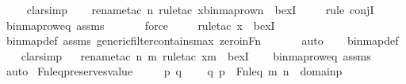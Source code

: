 \begin{isabellebody}
\ \ \ \isamarkupfalse%
\ clarsimp\isanewline
\ \ \ \isamarkupfalse%
{\isacharparenleft}{\kern0pt}rename{\isacharunderscore}{\kern0pt}tac\ n{\isacharcomma}{\kern0pt}\ rule{\isacharunderscore}{\kern0pt}tac\ x{\isacharequal}{\kern0pt}{\isachardoublequoteopen}binmap{\isacharunderscore}{\kern0pt}row{\isacharprime}{\kern0pt}{\isacharparenleft}{\kern0pt}n{\isacharparenright}{\kern0pt}{\isachardoublequoteclose}\ \ bexI{\isacharparenright}{\kern0pt}\isanewline
\ \ \ \ \isamarkupfalse%
{\isacharparenleft}{\kern0pt}rule\ conjI{\isacharparenright}{\kern0pt}\isanewline
\ \ \isamarkupfalse%
\ binmap{\isacharunderscore}{\kern0pt}row{\isacharunderscore}{\kern0pt}eq\ assms\isanewline
\ \ \ \ \ \isamarkupfalse%
\ force\isanewline
\ \ \ \ \isamarkupfalse%
{\isacharparenleft}{\kern0pt}rule{\isacharunderscore}{\kern0pt}tac\ x{\isacharequal}{\kern0pt}{}\ \ bexI{\isacharparenright}{\kern0pt}\isanewline
\ \ \isamarkupfalse%
\ binmap{\isacharprime}{\kern0pt}{\isacharunderscore}{\kern0pt}def\ assms\ generic{\isacharunderscore}{\kern0pt}filter{\isacharunderscore}{\kern0pt}contains{\isacharunderscore}{\kern0pt}max\ zero{\isacharunderscore}{\kern0pt}in{\isacharunderscore}{\kern0pt}Fn\isanewline
\ \ \ \ \ \isamarkupfalse%
\ auto{\isacharbrackleft}{\kern0pt}{}{\isacharbrackright}{\kern0pt}\isanewline
\ \ \isamarkupfalse%
\ binmap{\isacharprime}{\kern0pt}{\isacharunderscore}{\kern0pt}def\isanewline
\ \ \isamarkupfalse%
\ clarsimp\isanewline
\ \ \isamarkupfalse%
{\isacharparenleft}{\kern0pt}rename{\isacharunderscore}{\kern0pt}tac\ n\ m{\isacharcomma}{\kern0pt}\ rule{\isacharunderscore}{\kern0pt}tac\ x{\isacharequal}{\kern0pt}m\ \ bexI{\isacharparenright}{\kern0pt}\isanewline
\ \ \isamarkupfalse%
\ binmap{\isacharunderscore}{\kern0pt}row{\isacharunderscore}{\kern0pt}eq\ assms\isanewline
\ \ \isamarkupfalse%
\ auto%
\endisatagproof
{\isafoldproof}%
%
\isadelimproof
\isanewline
%
\endisadelimproof
\isanewline
{}\isamarkupfalse%
\ Fn{\isacharunderscore}{\kern0pt}leq{\isacharunderscore}{\kern0pt}preserves{\isacharunderscore}{\kern0pt}value\ {\isacharcolon}{\kern0pt}\ \isanewline
\ \ \ p\ q\ \isanewline
\ \ \ {\isachardoublequoteopen}{\isacharless}{\kern0pt}q{\isacharcomma}{\kern0pt}\ p{\isachargreater}{\kern0pt}\ {\isasymin}\ Fn{\isacharunderscore}{\kern0pt}leq{\isachardoublequoteclose}\ {\isachardoublequoteopen}{\isacharless}{\kern0pt}m{\isacharcomma}{\kern0pt}\ n{\isachargreater}{\kern0pt}\ {\isasymin}\ domain{\isacharparenleft}{\kern0pt}p{\isacharparenright}{\kern0pt}{\isachardoublequoteclose}\ \isanewline

\end{isabellebody}
